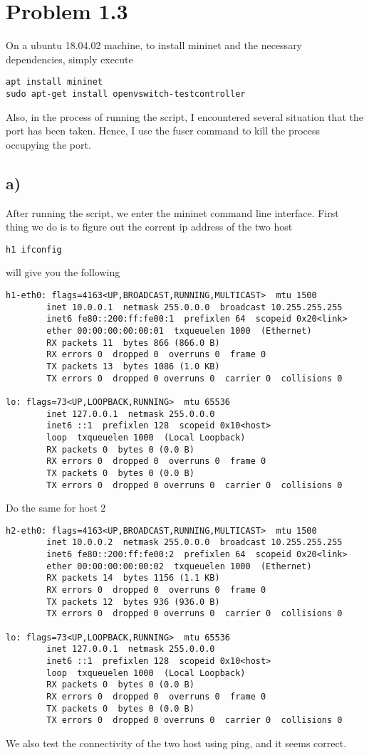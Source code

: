 \documentclass[11pt]{article}
\begin{document}
\section{Problem 1.3}
\label{sec:orgd00d542}
On a ubuntu 18.04.02 machine, to install mininet and the necessary dependencies,
simply execute
\begin{verbatim}
apt install mininet
sudo apt-get install openvswitch-testcontroller
\end{verbatim}
Also, in the process of running the script, I encountered several situation that the port has been taken.
Hence, I use the fuser command to kill the process occupying the port.
\subsection{a)}
\label{sec:orge5085f2}
After running the script, we enter the mininet command line interface. First thing we do is to figure out
the corrent ip address of the two host
\begin{verbatim}
h1 ifconfig
\end{verbatim}
will give you the following
\begin{verbatim}
h1-eth0: flags=4163<UP,BROADCAST,RUNNING,MULTICAST>  mtu 1500
        inet 10.0.0.1  netmask 255.0.0.0  broadcast 10.255.255.255
        inet6 fe80::200:ff:fe00:1  prefixlen 64  scopeid 0x20<link>
        ether 00:00:00:00:00:01  txqueuelen 1000  (Ethernet)
        RX packets 11  bytes 866 (866.0 B)
        RX errors 0  dropped 0  overruns 0  frame 0
        TX packets 13  bytes 1086 (1.0 KB)
        TX errors 0  dropped 0 overruns 0  carrier 0  collisions 0

lo: flags=73<UP,LOOPBACK,RUNNING>  mtu 65536
        inet 127.0.0.1  netmask 255.0.0.0
        inet6 ::1  prefixlen 128  scopeid 0x10<host>
        loop  txqueuelen 1000  (Local Loopback)
        RX packets 0  bytes 0 (0.0 B)
        RX errors 0  dropped 0  overruns 0  frame 0
        TX packets 0  bytes 0 (0.0 B)
        TX errors 0  dropped 0 overruns 0  carrier 0  collisions 0
\end{verbatim}
Do the same for host 2
\begin{verbatim}
h2-eth0: flags=4163<UP,BROADCAST,RUNNING,MULTICAST>  mtu 1500
        inet 10.0.0.2  netmask 255.0.0.0  broadcast 10.255.255.255
        inet6 fe80::200:ff:fe00:2  prefixlen 64  scopeid 0x20<link>
        ether 00:00:00:00:00:02  txqueuelen 1000  (Ethernet)
        RX packets 14  bytes 1156 (1.1 KB)
        RX errors 0  dropped 0  overruns 0  frame 0
        TX packets 12  bytes 936 (936.0 B)
        TX errors 0  dropped 0 overruns 0  carrier 0  collisions 0

lo: flags=73<UP,LOOPBACK,RUNNING>  mtu 65536
        inet 127.0.0.1  netmask 255.0.0.0
        inet6 ::1  prefixlen 128  scopeid 0x10<host>
        loop  txqueuelen 1000  (Local Loopback)
        RX packets 0  bytes 0 (0.0 B)
        RX errors 0  dropped 0  overruns 0  frame 0
        TX packets 0  bytes 0 (0.0 B)
        TX errors 0  dropped 0 overruns 0  carrier 0  collisions 0
\end{verbatim}
We also test the connectivity of the two host using ping, and it seems correct.
\end{document}
